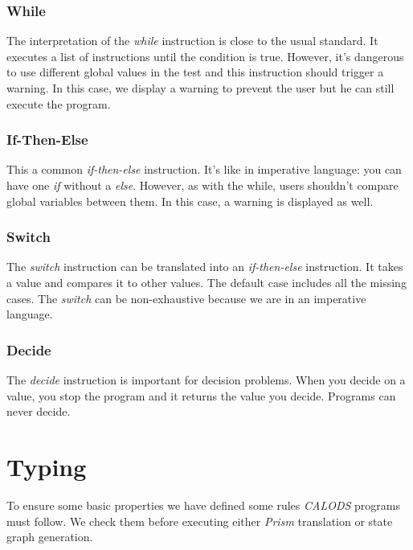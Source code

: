 \documentclass{article}
\begin{document}
\subsubsection{While}
The interpretation of the \textit{while} instruction is close to the usual standard. It executes a list of instructions until the condition is true. However, it's dangerous to use different global values in the test and this instruction should trigger a warning. In this case, we display a warning to prevent the user but he can still execute the program.
\subsubsection{If-Then-Else}
This a common \textit{if-then-else} instruction. It's like in imperative language: you can have one \textit{if} without a \textit{else}. However, as with the while, users shouldn't compare global variables between them. In this case, a warning is displayed as well.
\subsubsection{Switch}
The \textit{switch} instruction can be translated into an \textit{if-then-else} instruction. It takes a value and compares it to other values. The default case includes all the missing cases. The \textit{switch} can be non-exhaustive because we are in an imperative language.
\subsubsection{Decide}
The \textit{decide} instruction is important for decision problems. When you decide on a value, you stop the program and it returns the value you decide. Programs can never decide.


\section{Typing}
To ensure some basic properties we have defined some rules \textit{CALODS} programs must follow. We check them before executing either \textit{Prism} translation or state graph generation.
\end{document}
